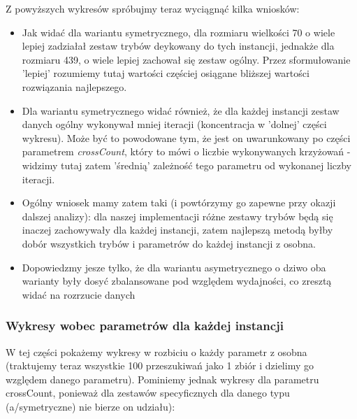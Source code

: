 \documentclass{article}
\begin{document}
\newpage
Z powyższych wykresów spróbujmy teraz wyciągnąć kilka wniosków:
\begin{itemize}
	\item Jak widać dla wariantu symetrycznego, dla rozmiaru wielkości 70 o wiele lepiej zadziałał zestaw trybów deykowany do tych instancji, jednakże dla rozmiaru 439, o wiele lepiej zachował się zestaw ogólny. Przez sformułowanie 'lepiej' rozumiemy tutaj wartości częściej osiągane bliższej wartości rozwiązania najlepszego.
	\item Dla wariantu symetrycznego widać również, że dla każdej instancji zestaw danych ogólny wykonywał mniej iteracji (koncentracja w 'dolnej' części wykresu). Może być to powodowane tym, że jest on uwarunkowany po części parametrem \textit{crossCount}, który to mówi o liczbie wykonywanych krzyżowań - widzimy tutaj zatem 'średnią' zależność tego parametru od wykonanej liczby iteracji.
	\item Ogólny wniosek mamy zatem taki (i powtórzymy go zapewne przy okazji dalszej analizy): dla naszej implementacji różne zestawy trybów będą się inaczej zachowywały dla każdej instancji, zatem najlepszą metodą byłby dobór wszystkich trybów i parametrów do każdej instancji z osobna.
	\item Dopowiedzmy jesze tylko, że dla wariantu asymetrycznego o dziwo oba warianty były dosyć zbalansowane pod względem wydajności, co zresztą widać na rozrzucie danych
\end{itemize}

\subsubsection{Wykresy wobec parametrów dla każdej instancji}
W tej części pokażemy wykresy w rozbiciu o każdy parametr z osobna (traktujemy teraz wszystkie 100 przeszukiwań jako 1 zbiór i dzielimy go względem danego parametru). Pominiemy jednak wykresy dla parametru crossCount, ponieważ dla zestawów specyficznych dla danego typu (a/symetryczne) nie bierze on udziału):
\end{document}
